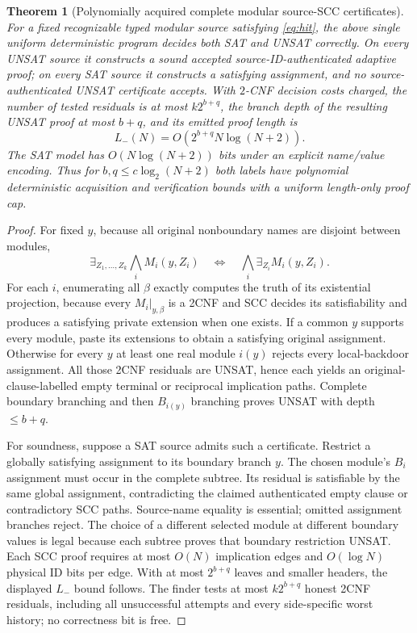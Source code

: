 \documentclass[11pt]{article}
\newtheorem{theorem}{Theorem}
\begin{document}
\begin{theorem}[Polynomially acquired complete modular source-SCC certificates]\label{th:modular}
For a fixed recognizable typed modular source satisfying \eqref{eq:hit}, the above \emph{single uniform deterministic program} decides both SAT and UNSAT correctly. On every UNSAT source it constructs a sound accepted source-ID-authenticated adaptive proof; on every SAT source it constructs a satisfying assignment, and \emph{no} source-authenticated UNSAT certificate accepts. With $2$-CNF decision costs charged, the number of tested residuals is at most $k2^{b+q}$, the branch depth of the resulting UNSAT proof at most $b+q$, and its emitted proof length is
\[
 L_{-}(N) = O(2^{b+q}N\log(N+2)).
\]
The SAT model has $O(N\log(N+2))$ bits under an explicit name/value encoding. Thus for $b,q\le c\log_2(N+2)$ both labels have polynomial deterministic acquisition and verification bounds with a uniform length-only proof cap.
\end{theorem}
\begin{proof}
For fixed $y$, because all original nonboundary names are disjoint between modules,
\[
  \exists_{Z_1,\ldots,Z_k}\bigwedge_i M_i(y,Z_i)
  \quad\Longleftrightarrow\quad
  \bigwedge_i \exists_{Z_i}M_i(y,Z_i).
\]
For each $i$, enumerating all $\beta$ exactly computes the truth of its existential projection, because every $M_i|_{y,\beta}$ is a 2CNF and SCC decides its satisfiability and produces a satisfying private extension when one exists. If a common $y$ supports every module, paste its extensions to obtain a satisfying original assignment. Otherwise for every $y$ at least one real module $i(y)$ rejects every local-backdoor assignment. All those 2CNF residuals are UNSAT, hence each yields an original-clause-labelled empty terminal or reciprocal implication paths. Complete boundary branching and then $B_{i(y)}$ branching proves UNSAT with depth $\le b+q$.

For soundness, suppose a SAT source admits such a certificate. Restrict a globally satisfying assignment to its boundary branch $y$. The chosen module's $B_i$ assignment must occur in the complete subtree. Its residual is satisfiable by the same global assignment, contradicting the claimed authenticated empty clause or contradictory SCC paths. Source-name equality is essential; omitted assignment branches reject. The choice of a different selected module at different boundary values is legal because each subtree proves that boundary restriction UNSAT. Each SCC proof requires at most $O(N)$ implication edges and $O(\log N)$ physical ID bits per edge. With at most $2^{b+q}$ leaves and smaller headers, the displayed $L_-$ bound follows. The finder tests at most $k2^{b+q}$ honest 2CNF residuals, including all unsuccessful attempts and every side-specific worst history; no correctness bit is free.\end{proof}
\end{document}
